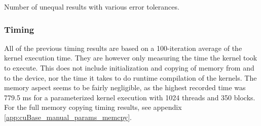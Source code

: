 \begin{table}[h!]
\centering
{}
\caption{Number of unequal results with various error tolerances.\label{table:errorComparison}}
\caption*{32 = single precision, 64 = double precision}
\end{table}

\subsubsection{Timing}
All of the previous timing results are based on a 100-iteration average of the kernel execution time.
They are however only measuring the time the kernel took to execute.
This does not include initialization and copying of memory from and to the device, nor the time it takes to do runtime compilation of the kernels.
The memory aspect seems to be fairly negligible, as the highest recorded time was 779.5 ms for a parameterized kernel execution with 1024 threads and 350 blocks.
For the full memory copying timing results, see appendix \ref{app:cuBase_manual_params_memcpy}.

